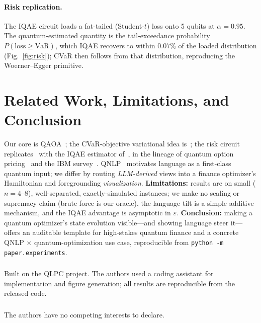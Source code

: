 \documentclass[runningheads]{llncs}
\newcommand{\TailErr}{0.07}
\begin{document}
\paragraph{Risk replication.}
The IQAE circuit loads a fat-tailed (Student-$t$) loss onto 5 qubits at $\alpha{=}0.95$. The
quantum-estimated quantity is the tail-exceedance probability $P(\mathrm{loss}\ge\mathrm{VaR})$, which
IQAE recovers to within $\TailErr\%$ of the loaded distribution (Fig.~\ref{fig:risk}); CVaR then follows
from that distribution, reproducing the Woerner--Egger primitive.

\section{Related Work, Limitations, and Conclusion}
Our core is QAOA~\cite{farhi2014qaoa}; the CVaR-objective variational idea is~\cite{barkoutsos2020cvar};
the risk circuit replicates~\cite{woerner2019risk} with the IQAE estimator of~\cite{grant2021iqae}, in the
lineage of quantum option pricing~\cite{stamatopoulos2020option} and the IBM survey~\cite{egger2020finance}.
QNLP~\cite{coecke2010dispho,lorenz2023qnlp} motivates language as a first-class quantum input; we differ
by routing \emph{LLM-derived} views into a finance optimizer's Hamiltonian and foregrounding
\emph{visualization}. \textbf{Limitations:} results are on small ($n{=}4$--$8$), well-separated,
exactly-simulated instances; we make no scaling or supremacy claim (brute force is our oracle), the
language tilt is a simple additive mechanism, and the IQAE advantage is asymptotic in $\varepsilon$.
\textbf{Conclusion:} making a quantum optimizer's state evolution visible---and showing language steer
it---offers an auditable template for high-stakes quantum finance and a concrete QNLP $\times$
quantum-optimization use case, reproducible from \texttt{python -m paper.experiments}.

\begin{credits}
\subsubsection{\ackname} Built on the QLPC project. The authors used a coding assistant for
implementation and figure generation; all results are reproducible from the released code.
\subsubsection{\discintname} The authors have no competing interests to declare.
\end{credits}
\end{document}

